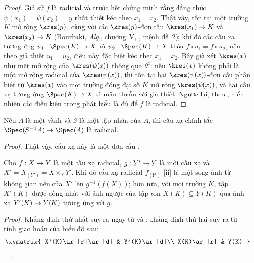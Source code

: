 \documentclass[oneside]{amsart}
\makeatletter
\newcommand{\ega@arrow}[2]{\mathchoice{#1}{#2}{#2}{#2}}
\renewcommand{\to}{\ega@arrow{\longrightarrow}{\rightarrow}}
\newcommand{\oldpage}[2][]{{\marginnote{\normalfont\textbf{#1}~|~#2}}\ignorespaces}
\let\EGAOriginalLabel\label
\renewcommand{\label}[1]{\phantomsection\EGAOriginalLabel{#1}}
\makeatother
\begin{document}
\begin{proof}
Giả sử $f$ là radicial và trước hết chứng minh rằng đẳng thức
$\psi(x_1)=\psi(x_2)=y$ nhất thiết kéo theo $x_1=x_2$.
Thật vậy, tồn tại một trường $K$ mở rộng $\kres(y)$, cùng với các
$\kres(y)$-đơn cấu $\kres(x_1)\to K$ và $\kres(x_2)\to K$ (Bourbaki,
\emph{Alg.}, chương~V, , mệnh đề~2); khi đó các cấu xạ tương ứng
$u_1:\Spec(K)\to X$ và $u_2:\Spec(K)\to X$ thỏa
$f\circ u_1=f\circ u_2$, nên theo giả thiết $u_1=u_2$, điều này đặc biệt
kéo theo $x_1=x_2$.
Bây giờ xét $\kres(x)$ như một mở rộng của $\kres(\psi(x))$ thông qua
$\theta^x$: nếu $\kres(x)$ không phải là một mở rộng radicial của
$\kres(\psi(x))$, thì tồn tại hai $\kres(\psi(x))$-đơn cấu phân biệt từ
$\kres(x)$ vào một trường đóng đại số $K$ mở rộng $\kres(\psi(x))$, và hai
cấu xạ tương ứng $\Spec(K)\to X$ sẽ mâu thuẫn với giả thiết.
Ngược lại, theo , hiển nhiên các điều kiện trong phát biểu là
đủ để $f$ là radicial.
\end{proof}

\begin{corollary}[3.5.9]
\label{I.3.5.9}
Nếu $A$ là một vành và $S$ là một tập nhân của $A$, thì cấu xạ chính tắc
$\Spec(S^{-1}A)\to\Spec(A)$ là radicial.
\end{corollary}

\begin{proof}
Thật vậy, cấu xạ này là một đơn cấu .
\end{proof}

\begin{corollary}[3.5.10]
\label{I.3.5.10}
Cho $f:X\to Y$ là một cấu xạ radicial, $g:Y'\to Y$ là một cấu xạ và
$X'=X_{(Y')}=X\times_Y Y'$.
Khi đó cấu xạ radicial $f_{(Y')}$ [ii] là một song ánh từ
không gian nền của $X'$ lên $g^{-1}(f(X))$; hơn nữa, với mọi trường $K$, tập
$X'(K)$ được đồng nhất với ảnh ngược của tập con $X(K)\subseteq Y(K)$ qua
ánh xạ $Y'(K)\to Y(K)$ tương ứng với $g$.
\end{corollary}

\begin{proof}
Khẳng định thứ nhất suy ra ngay từ  và ; khẳng
định thứ hai suy ra từ tính giao hoán của biểu đồ sau:
\oldpage[I]{117}
\[
  \xymatrix{
    X'(K)\ar[r]\ar[d] &
    Y'(K)\ar[d]\\
    X(K)\ar[r] &
    Y(K)
  }
\]
\end{proof}
\end{document}
